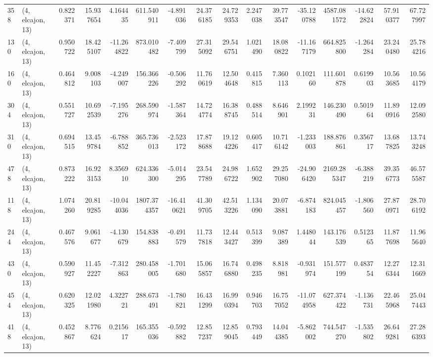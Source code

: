 \begin{tabular}{llrrrrrrrrrrrrrr}
358 &  (4, elcajon, 13) &   0.822371 &  15.937654 &   4.164435 &   611.540911 &  -4.891036 &  24.376185 &  24.729353 &  2.247038 &  39.773547 & -35.120788 &  4587.081572 & -14.622824 &  57.910377 &  67.727997 \\
130 &  (4, elcajon, 13) &   0.950722 &  18.425107 & -11.264822 &   873.010482 &  -7.409799 &  27.315092 &  29.546751 &  1.021490 &  18.080822 & -11.167179 &   664.825800 &  -1.264284 &  23.240480 &  25.784216 \\
160 &  (4, elcajon, 13) &   0.464812 &   9.008103 &  -4.249007 &   156.366226 &  -0.506292 &  11.760619 &  12.504648 &  0.415815 &   7.360113 &   0.102160 &   111.601878 &   0.619903 &  10.563685 &  10.564179 \\
304 &  (4, elcajon, 13) &   0.551727 &  10.692539 &  -7.195276 &   268.590974 &  -1.587364 &  14.724774 &  16.388745 &  0.488514 &   8.646901 &   2.199231 &   146.230490 &   0.501964 &  11.890916 &  12.092580 \\
310 &  (4, elcajon, 13) &   0.694515 &  13.459784 &  -6.788852 &   365.736013 &  -2.523172 &  17.878688 &  19.124226 &  0.605417 &  10.716142 &  -1.233003 &   188.876861 &   0.356717 &  13.687825 &  13.743248 \\
478 &  (4, elcajon, 13) &   0.873222 &  16.923153 &   8.356910 &   624.336300 &  -5.014295 &  23.547789 &  24.986722 &  1.652902 &  29.257080 & -24.906420 &  2169.285347 &  -6.388219 &  39.356773 &  46.575587 \\
118 &  (4, elcajon, 13) &   1.074260 &  20.819285 & -10.044036 &  1807.374357 & -16.410621 &  41.309705 &  42.513226 &  1.134090 &  20.073881 &  -6.874183 &   824.045457 &  -1.806560 &  27.870971 &  28.706192 \\
244 &  (4, elcajon, 13) &   0.467576 &   9.061677 &  -4.130679 &   154.838883 &  -0.491579 &  11.737818 &  12.443427 &  0.513399 &   9.087389 &   1.448044 &   143.176539 &   0.512365 &  11.877698 &  11.965640 \\
430 &  (4, elcajon, 13) &   0.590927 &  11.452227 &  -7.312863 &   280.458005 &  -1.701680 &  15.065857 &  16.746880 &  0.498235 &   8.818981 &  -0.931974 &   151.577199 &   0.483754 &  12.276344 &  12.311669 \\
454 &  (4, elcajon, 13) &   0.620325 &  12.021980 &   4.322721 &   288.673491 &  -1.780821 &  16.431299 &  16.990394 &  0.946703 &  16.757052 & -11.074958 &   627.374422 &  -1.136731 &  22.465968 &  25.047443 \\
418 &  (4, elcajon, 13) &   0.452867 &   8.776624 &   0.215617 &   165.355036 &  -0.592882 &  12.857237 &  12.859045 &  0.793449 &  14.044385 &  -5.862002 &   744.547270 &  -1.535802 &  26.649281 &  27.286393 \\

\end{tabular}
